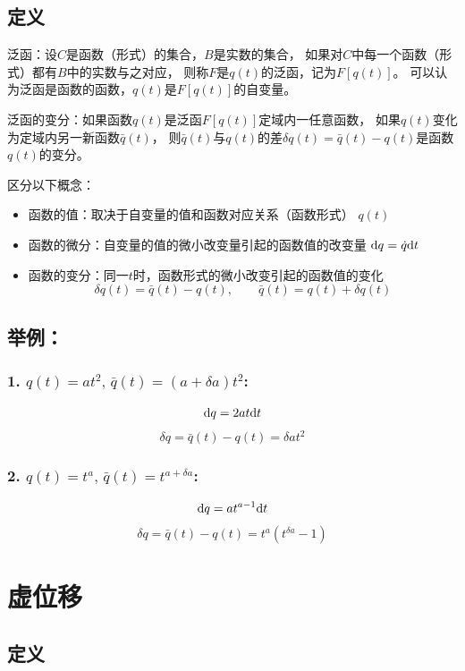 \subsection*{定义}
泛函：设\(C\)是函数（形式）的集合，\(B\)是实数的集合，
如果对\(C\)中每一个函数（形式）都有\(B\)中的实数与之对应，
则称\(F\)是\(q(t)\)的泛函，记为\(F[q(t)]\)。
可以认为泛函是函数的函数，\(q(t)\)是\(F[q(t)]\)的自变量。\par
泛函的变分：如果函数\(q(t)\)是泛函\(F[q(t)]\)定域内一任意函数，
如果\(q(t)\)变化为定域内另一新函数\(\bar{q}(t)\)，
则\(\bar{q}(t)\)与\(q(t)\)的差\(\delta q(t)=\bar{q}(t)-q(t)\)是函数\(q(t)\)的变分。

区分以下概念：
\begin{itemize}
    \item 函数的值：取决于自变量的值和函数对应关系（函数形式） \(q(t)\)
    \item 函数的微分：自变量的值的微小改变量引起的函数值的改变量 \(\mathrm{d} q=\dot{q}\mathrm{d} t\)
    \item 函数的变分：同一\(t\)时，函数形式的微小改变引起的函数值的变化 \[\delta q(t)=\bar{q}(t)-q(t),\quad\quad\bar{q}(t)=q(t)+\delta q(t)\]
\end{itemize}

\subsection*{举例：}
\subsubsection*{1. \(q(t)=at^2,\,\bar{q}(t)=(a+\delta a)t^2\):}

\[\mathrm{d} q=2at\mathrm{d} t\]
\[\delta q=\bar{q}(t)-q(t)=\delta at^2\]

\subsubsection*{2. \(q(t)=t^a,\,\bar{q}(t)=t^{a+\delta a}\):}

\[\mathrm{d} q=at^{a-1}\mathrm{d} t\]
\[\delta q=\bar{q}(t)-q(t)=t^a\left(t^{\delta a}-1\right)\]
  
\section{虚位移}

\subsection*{定义}

